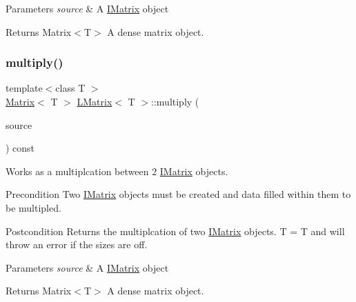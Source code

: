 \begin{DoxyParams}{Parameters}
{\em source} & A \mbox{\hyperlink{class_i_matrix}{I\+Matrix}} object \\
\hline
\end{DoxyParams}
\begin{DoxyReturn}{Returns}
Matrix$<$\+T$>$ A dense matrix object. 
\end{DoxyReturn}
\mbox{\label{class_l_matrix_a0cf963fd6b5fae298b7bf62198ce4371}} 
\subsubsection{\texorpdfstring{multiply()}{multiply()}\hspace{0.1cm}{\footnotesize\ttfamily [5/6]}}
{\footnotesize\ttfamily template$<$class T $>$ \\
\mbox{\hyperlink{class_matrix}{Matrix}}$<$ T $>$ \mbox{\hyperlink{class_l_matrix}{L\+Matrix}}$<$ T $>$\+::multiply (\begin{DoxyParamCaption}\item[{const \mbox{\hyperlink{class_i_matrix}{I\+Matrix}}$<$ \mbox{\hyperlink{class_s_matrix}{S\+Matrix}}$<$ T $>$, T $>$ \&}]{source }\end{DoxyParamCaption}) const}



Works as a multiplcation between 2 \mbox{\hyperlink{class_i_matrix}{I\+Matrix}} objects. 

\begin{DoxyPrecond}{Precondition}
Two \mbox{\hyperlink{class_i_matrix}{I\+Matrix}} objects must be created and data filled within them to be multipled. 
\end{DoxyPrecond}
\begin{DoxyPostcond}{Postcondition}
Returns the multiplcation of two \mbox{\hyperlink{class_i_matrix}{I\+Matrix}} objects. T = T and will throw an error if the sizes are off.
\end{DoxyPostcond}

\begin{DoxyParams}{Parameters}
{\em source} & A \mbox{\hyperlink{class_i_matrix}{I\+Matrix}} object \\
\hline
\end{DoxyParams}
\begin{DoxyReturn}{Returns}
Matrix$<$\+T$>$ A dense matrix object. 
\end{DoxyReturn}
\mbox{\label{class_l_matrix_a68ca1f28d4ca8ace38b621fb89e57631}} 
